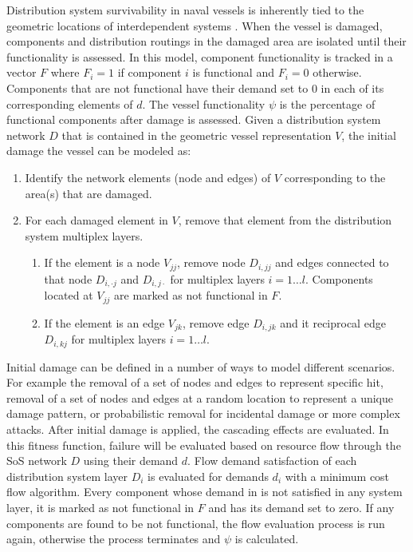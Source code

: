 \documentclass[preprint,12pt]{elsarticle}
\begin{document}
Distribution system survivability in naval vessels is inherently tied to the geometric locations of interdependent systems \citep{Amy2002}. When the vessel is damaged, components and distribution routings in the damaged area are isolated until their functionality is assessed. In this model, component functionality is tracked in a vector $F$ where $F_i=1$ if component $i$ is functional and $F_i=0$ otherwise. Components that are not functional have their demand set to $0$ in each of its corresponding elements of $d$. The vessel functionality $\psi$ is the percentage of functional components after damage is assessed. Given a distribution system network $D$ that is contained in the geometric vessel representation $V$, the initial damage the vessel can be modeled as:

\begin{enumerate}
	\item  Identify the network elements (node and edges) of $V$ corresponding to the area(s) that are damaged.
	\item For each damaged element in $V$, remove that element from the distribution system multiplex layers.
	\begin{enumerate}
		\item If the element is a node $V_{jj}$, remove node $D_{i,jj}$ and edges connected to that node $D_{i,\cdot j}$ and $D_{i,j \cdot}$ for multiplex layers $i=1\ldots l$. Components located at $V_{jj}$ are marked as not functional in $F$.
		\item If the element is an edge $V_{jk}$, remove edge $D_{i,jk}$ and it reciprocal edge $D_{i,kj}$ for multiplex layers $i=1\ldots l$.
	\end{enumerate}
\end{enumerate}


Initial damage can be defined in a number of ways to model different scenarios. For example the removal of a set of nodes and edges to represent specific hit, removal of a set of nodes and edges at a random location to represent a unique damage pattern, or probabilistic removal for incidental damage or more complex attacks. After initial damage is applied, the cascading effects are evaluated. In this fitness function, failure will be evaluated based on resource flow through the SoS network $D$ using their demand $d$. Flow demand satisfaction of each distribution system layer $D_i$ is evaluated for demands $d_i$ with a minimum cost flow algorithm. Every component whose demand in is not satisfied in any system layer, it is marked as not functional in $F$ and has its demand set to zero. If any components are found to be not functional, the flow evaluation process is run again, otherwise the process terminates and $\psi$ is calculated. 
\end{document}
